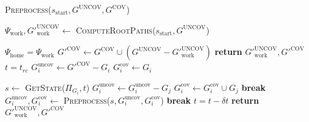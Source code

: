\documentclass[letterpaper]{article} %
\begin{document}
\begin{algorithm}
\caption{\textsc{Preprocess}($s_{\textrm{start}},G^{\textrm{UNCOV}},G^{\textrm{COV}}$)}\label{alg:1}
\begin{algorithmic}[1]
\State $\Psi_{\textrm{work}}, G'^{\textrm{UNCOV}}_{\textrm{work}} \leftarrow$ \textsc{ComputeRootPaths}($s_{\textrm{start}},G^{\textrm{UNCOV}}$)

    \State $\Psi_{\textrm{home}} = \Psi_{\textrm{work}}$
\EndIf
\State $G'^{\textrm{COV}} \leftarrow G^{\textrm{COV}} \cup (G^{\textrm{UNCOV}} - G'^{\textrm{UNCOV}}_{\textrm{work}})$
    \State \textbf{return} $G'^{\textrm{UNCOV}}_{\textrm{work}}, G'^{\textrm{COV}}$
\EndIf
{}
    \State $t = t_{rc}$
    \State $G_i^{\textrm{uncov}} \leftarrow G'^{\textrm{COV}} - G_i$
    \State $G_i^{\textrm{cov}} \leftarrow G_i$

    
        \State $s \leftarrow$ \textsc{GetState($\Pi_{G_i}, t$)}
                \State $G_i^{\textrm{uncov}} \leftarrow G_i^{\textrm{uncov}} - G_j$
                \State $G_i^{\textrm{cov}} \leftarrow G_i^{\textrm{cov}} \cup G_j$
            \EndIf
        \EndFor
            \State \textbf{break}
        \EndIf
        \State $G_i^{\textrm{uncov}},G_i^{\textrm{cov}} \leftarrow$ \textsc{Preprocess}($s,G_i^{\textrm{uncov}},G_i^{\textrm{cov}}$)
            \State \textbf{break}
        \EndIf
        \State $t = t - \delta t$
    \EndWhile
\EndFor
\State \textbf{return} $G'^{\textrm{UNCOV}}_{\textrm{work}}, G'^{\textrm{COV}}$

\end{algorithmic}
\end{algorithm}
\end{document}

